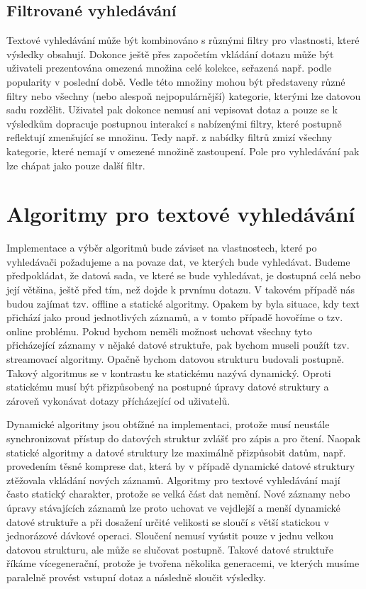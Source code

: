\documentclass[11pt,letterpaper,oneside,openright]{book}
\begin{document}
\subsection{Filtrované vyhledávání}
Textové vyhledávání může být kombinováno s různými filtry pro vlastnosti, které
výsledky obsahují. Dokonce ještě přes započetím vkládání dotazu může být
uživateli prezentována omezená množina celé kolekce, seřazená např. podle
popularity v poslední době. Vedle této množiny mohou být představeny různé
filtry nebo všechny (nebo alespoň nejpopulárnější) kategorie, kterými lze
datovou sadu rozdělit. Uživatel pak dokonce nemusí ani vepisovat dotaz a pouze
se k výsledkům dopracuje postupnou interakcí s nabízenými filtry, které
postupně reflektují zmenšující se množinu. Tedy např. z nabídky filtrů zmizí
všechny kategorie, které nemají v omezené množině zastoupení. Pole pro
vyhledávání pak lze chápat jako pouze další filtr.


\section{Algoritmy pro textové vyhledávání}
Implementace a výběr algoritmů bude záviset na vlastnostech, které po
vyhledávači požadujeme a na povaze dat, ve kterých bude vyhledávat. Budeme
předpokládat, že datová sada, ve které se bude vyhledávat, je dostupná celá
nebo její většina, ještě před tím, než dojde k prvnímu dotazu. V takovém
případě nás budou zajímat tzv. offline a statické algoritmy.  Opakem by byla
situace, kdy text přichází jako proud jednotlivých záznamů, a v tomto případě
hovoříme o tzv. online problému. Pokud bychom neměli možnost uchovat všechny
tyto přicházející záznamy v nějaké datové struktuře, pak bychom museli použít
tzv. streamovací algoritmy. Opačně bychom datovou strukturu budovali postupně.
Takový algoritmus se v kontrastu ke statickému nazývá dynamický. Oproti
statickému musí být přizpůsobený na postupné úpravy datové struktury a zároveň
vykonávat dotazy přícházející od uživatelů.

Dynamické algoritmy jsou obtížné na implementaci, protože musí neustále
synchronizovat přístup do datových struktur zvlášť pro zápis a pro čtení.
Naopak statické algoritmy a datové struktury lze maximálně přizpůsobit datům,
např. provedením těsné komprese dat, která by v případě dynamické datové
struktury ztěžovala vkládání nových záznamů. Algoritmy pro textové vyhledávání
mají často statický charakter, protože se velká část dat nemění. Nové záznamy
nebo úpravy stávajících záznamů lze proto uchovat ve vejdlejší a menší
dynamické datové struktuře a při dosažení určité velikosti se sloučí s větší
statickou v jednorázové dávkové operaci. Sloučení nemusí vyústit pouze v jednu
velkou datovou strukturu, ale může se slučovat postupně. Takové datové
struktuře říkáme vícegenerační, protože je tvořena několika generacemi, ve
kterých musíme paralelně provést vstupní dotaz a následně sloučit výsledky.
\end{document}
